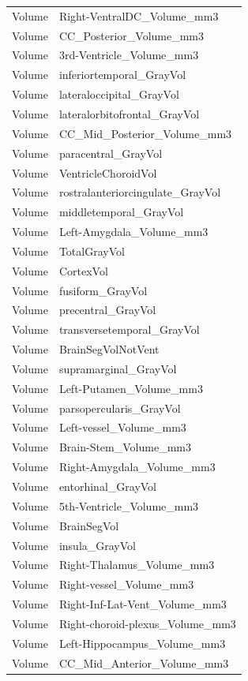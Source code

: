 \documentclass[pdflatex,sn-nature]{sn-jnl}%
\theoremstyle{thmstyleone}%
\theoremstyle{thmstyletwo}%
\theoremstyle{thmstylethree}%
\begin{document}
\begin{appendices}
\begin{small}
\begin{longtable}{l|l}
Volume & Right-VentralDC\_Volume\_mm3 \\
Volume & CC\_Posterior\_Volume\_mm3 \\
Volume & 3rd-Ventricle\_Volume\_mm3 \\
Volume & inferiortemporal\_GrayVol \\
Volume & lateraloccipital\_GrayVol \\
Volume & lateralorbitofrontal\_GrayVol \\
Volume & CC\_Mid\_Posterior\_Volume\_mm3 \\
Volume & paracentral\_GrayVol \\
Volume & VentricleChoroidVol \\
Volume & rostralanteriorcingulate\_GrayVol \\
Volume & middletemporal\_GrayVol \\
Volume & Left-Amygdala\_Volume\_mm3 \\
Volume & TotalGrayVol \\
Volume & CortexVol \\
Volume & fusiform\_GrayVol \\
Volume & precentral\_GrayVol \\
Volume & transversetemporal\_GrayVol \\
Volume & BrainSegVolNotVent \\
Volume & supramarginal\_GrayVol \\
Volume & Left-Putamen\_Volume\_mm3 \\
Volume & parsopercularis\_GrayVol \\
Volume & Left-vessel\_Volume\_mm3 \\
Volume & Brain-Stem\_Volume\_mm3 \\
Volume & Right-Amygdala\_Volume\_mm3 \\
Volume & entorhinal\_GrayVol \\
Volume & 5th-Ventricle\_Volume\_mm3 \\
Volume & BrainSegVol \\
Volume & insula\_GrayVol \\
Volume & Right-Thalamus\_Volume\_mm3 \\
Volume & Right-vessel\_Volume\_mm3 \\
Volume & Right-Inf-Lat-Vent\_Volume\_mm3 \\
Volume & Right-choroid-plexus\_Volume\_mm3 \\
Volume & Left-Hippocampus\_Volume\_mm3 \\
Volume & CC\_Mid\_Anterior\_Volume\_mm3 \\

\end{longtable}
\end{small}
\end{appendices}
\end{document}
